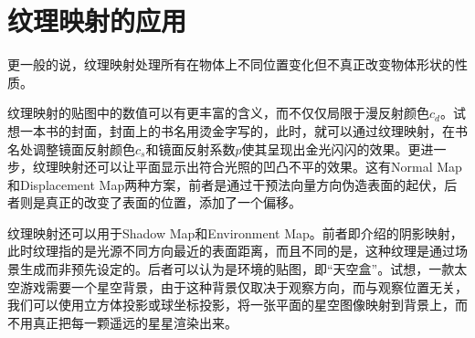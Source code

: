 \section{纹理映射的应用}
更一般的说，纹理映射处理所有在物体上不同位置变化但不真正改变物体形状的性质。

纹理映射的贴图中的数值可以有更丰富的含义，而不仅仅局限于漫反射颜色$c_d$。试想一本书的封面，封面上的书名用烫金字写的，此时，就可以通过纹理映射，在书名处调整镜面反射颜色$c_s$和镜面反射系数$p$使其呈现出金光闪闪的效果。更进一步，纹理映射还可以让平面显示出符合光照的凹凸不平的效果。这有Normal Map和Displacement Map两种方案，前者是通过干预法向量方向伪造表面的起伏，后者则是真正的改变了表面的位置，添加了一个偏移。

纹理映射还可以用于Shadow Map和Environment Map。前者即介绍的阴影映射，此时纹理指的是光源不同方向最近的表面距离，而且不同的是，这种纹理是通过场景生成而非预先设定的。后者可以认为是环境的贴图，即“天空盒”。试想，一款太空游戏需要一个星空背景，由于这种背景仅取决于观察方向，而与观察位置无关，我们可以使用立方体投影或球坐标投影，将一张平面的星空图像映射到背景上，而不用真正把每一颗遥远的星星渲染出来。